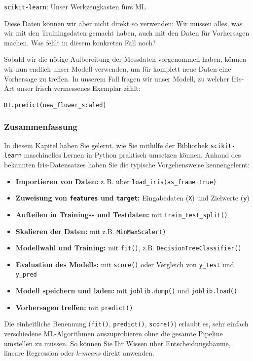 \begin{lpu}{\texttt{scikit-learn}: Unser Werkzeugkasten fürs ML}
\begin{aufgabe}{3}
Diese Daten können wir aber nicht direkt so verwenden: Wir müssen alles, was wir mit den Trainingsdaten gemacht haben, auch mit den Daten für Vorhersagen machen. Was fehlt in diesem konkreten Fall noch?
\end{aufgabe}

Sobald wir die nötige Aufbereitung der Messdaten vorgenommen haben, können wir nun endlich unser Modell verwenden, um für komplett neue Daten eine Vorhersage zu treffen. In unserem Fall fragen wir unser Modell, zu welcher Iris-Art unser frisch vermessenes Exemplar zählt:

\begin{lstlisting}[language=Python]
DT.predict(new_flower_scaled)
\end{lstlisting}


\subsubsection*{Zusammenfassung}

In diesem Kapitel haben Sie gelernt, wie Sie mithilfe der Bibliothek \texttt{scikit-learn} maschinelles Lernen in Python praktisch umsetzen können. Anhand des bekannten Iris-Datensatzes haben Sie die typische Vorgehensweise kennengelernt:

\begin{itemize}
  \item \textbf{Importieren von Daten:} z. B. über \texttt{load\_iris(as\_frame=True)}
  \item \textbf{Zuweisung von \texttt{features} und \texttt{target}:} Eingabedaten (\texttt{X}) und Zielwerte (\texttt{y})
  \item \textbf{Aufteilen in Trainings- und Testdaten:} mit \texttt{train\_test\_split()}
  \item \textbf{Skalieren der Daten:} mit z.B. \texttt{MinMaxScaler()}
  \item \textbf{Modellwahl und Training:} mit \texttt{fit()}, z.B. \texttt{DecisionTreeClassifier()}
  \item \textbf{Evaluation des Modells:} mit \texttt{score()} oder Vergleich von \texttt{y\_test} und \texttt{y\_pred}
  \item \textbf{Modell speichern und laden:} mit \texttt{joblib.dump()} und \texttt{joblib.load()}
  \item \textbf{Vorhersagen treffen:} mit \texttt{predict()}
\end{itemize}

Die einheitliche Benennung (\texttt{fit()}, \texttt{predict()}, \texttt{score()}) erlaubt es, sehr einfach verschiedene ML-Algorithmen auszuprobieren ohne die gesamte Pipeline umstellen zu müssen. So können Sie Ihr Wissen über Entscheidungsbäume, lineare Regression oder \textit{k-means} direkt anwenden.





\end{lpu}



